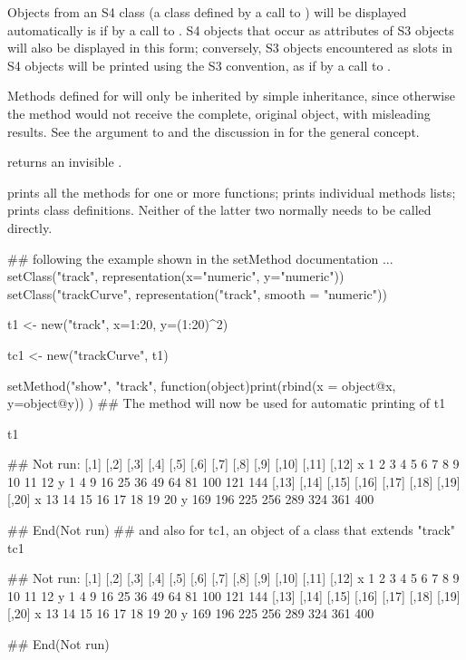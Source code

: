 %
\begin{Details}\relax
Objects from an S4 class (a class defined by a call to
) will be displayed automatically is if by a
call to .  S4 objects that occur as attributes of S3
objects will also be displayed in this form; conversely, S3 objects
encountered as slots in S4 objects will be printed using the S3
convention, as if by a call to .

Methods defined for  will only be inherited  by simple
inheritance, since otherwise the method would not receive the
complete, original object, with misleading results.  See the
 argument to  and
the discussion in  for the general concept.

\end{Details}
%
\begin{Value}
 returns an invisible .
\end{Value}
%
\begin{SeeAlso}\relax
{} prints all the methods for one or more
functions;
 prints individual methods lists; 
 prints class definitions.
Neither of the latter two normally needs to be called directly.
\end{SeeAlso}
%
\begin{Examples}
\begin{ExampleCode}
## following the example shown in the setMethod documentation ...
setClass("track",
         representation(x="numeric", y="numeric"))
setClass("trackCurve", 
         representation("track", smooth = "numeric"))

t1 <- new("track", x=1:20, y=(1:20)^2)

tc1 <- new("trackCurve", t1)

setMethod("show", "track",
  function(object)print(rbind(x = object@x, y=object@y))
)
## The method will now be used for automatic printing of t1

t1

## Not run:   [,1] [,2] [,3] [,4] [,5] [,6] [,7] [,8] [,9] [,10] [,11] [,12]
x    1    2    3    4    5    6    7    8    9    10    11    12
y    1    4    9   16   25   36   49   64   81   100   121   144
  [,13] [,14] [,15] [,16] [,17] [,18] [,19] [,20]
x    13    14    15    16    17    18    19    20
y   169   196   225   256   289   324   361   400

## End(Not run)
## and also for tc1, an object of a class that extends "track"
tc1

## Not run:   [,1] [,2] [,3] [,4] [,5] [,6] [,7] [,8] [,9] [,10] [,11] [,12]
x    1    2    3    4    5    6    7    8    9    10    11    12
y    1    4    9   16   25   36   49   64   81   100   121   144
  [,13] [,14] [,15] [,16] [,17] [,18] [,19] [,20]
x    13    14    15    16    17    18    19    20
y   169   196   225   256   289   324   361   400

## End(Not run)
\end{ExampleCode}
\end{Examples}
